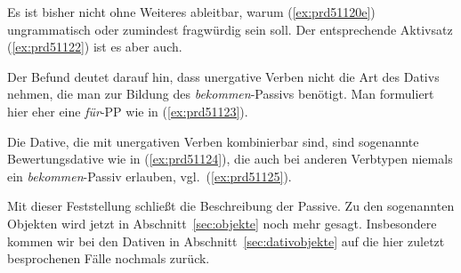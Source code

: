 \begin{exe}
  \ex\label{ex:prd51121} 
  \begin{xlist}
  \end{xlist}
\end{exe}

Es ist bisher nicht ohne Weiteres ableitbar, warum (\ref{ex:prd51120e}) ungrammatisch oder zumindest fragwürdig sein soll.
Der entsprechende Aktivsatz (\ref{ex:prd51122}) ist es aber auch.

\begin{exe}
\end{exe}


Der Befund deutet darauf hin, dass unergative Verben nicht die Art des Dativs nehmen, die man zur Bildung des \textit{bekommen}-Passivs benötigt.
Man formuliert hier eher eine \textit{für}-PP wie in (\ref{ex:prd51123}).

\begin{exe}
\end{exe}

Die Dative, die mit unergativen Verben kombinierbar sind, sind sogenannte Bewertungsdative wie in (\ref{ex:prd51124}), die auch bei anderen Verbtypen niemals ein \textit{bekommen}-Passiv erlauben, vgl.\ (\ref{ex:prd51125}).

\begin{exe}
  \ex\label{ex:prd51124} 
  \begin{xlist}
  \end{xlist}
  \ex\label{ex:prd51125} 
  \begin{xlist}
  \end{xlist}
\end{exe}

Mit dieser Feststellung schließt die Beschreibung der Passive.
Zu den sogenannten Objekten wird jetzt in Abschnitt~\ref{sec:objekte} noch mehr gesagt.
Insbesondere kommen wir bei den Dativen in Abschnitt~\ref{sec:dativobjekte} auf die hier zuletzt besprochenen Fälle nochmals zurück.

